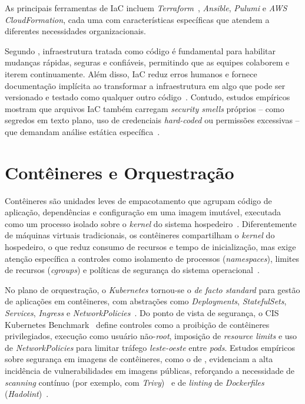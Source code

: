 As principais ferramentas de IaC incluem \textit{Terraform}~, \textit{Ansible}, \textit{Pulumi} e \textit{AWS CloudFormation}, cada uma com características específicas que atendem a diferentes necessidades organizacionais.

Segundo , infraestrutura tratada como código é fundamental para habilitar mudanças rápidas, seguras e confiáveis, permitindo que as equipes colaborem e iterem continuamente. Além disso, IaC reduz erros humanos e fornece documentação implícita ao transformar a infraestrutura em algo que pode ser versionado e testado como qualquer outro código~. Contudo, estudos empíricos mostram que arquivos IaC também carregam \textit{security smells} próprios -- como segredos em texto plano, uso de credenciais \textit{hard-coded} ou permissões excessivas -- que demandam análise estática específica~.

\section{Contêineres e Orquestração}
\label{sec:containers-orquestracao}

Contêineres são unidades leves de empacotamento que agrupam código de aplicação, dependências e configuração em uma imagem imutável, executada como um processo isolado sobre o \textit{kernel} do sistema hospedeiro~. Diferentemente de máquinas virtuais tradicionais, os contêineres compartilham o \textit{kernel} do hospedeiro, o que reduz consumo de recursos e tempo de inicialização, mas exige atenção específica a controles como isolamento de processos (\textit{namespaces}), limites de recursos (\textit{cgroups}) e políticas de segurança do sistema operacional~.

No plano de orquestração, o \textit{Kubernetes} tornou-se o \textit{de facto standard} para gestão de aplicações em contêineres, com abstrações como \textit{Deployments}, \textit{StatefulSets}, \textit{Services}, \textit{Ingress} e \textit{NetworkPolicies}~. Do ponto de vista de segurança, o CIS Kubernetes Benchmark~ define controles como a proibição de contêineres privilegiados, execução como usuário não-\textit{root}, imposição de \textit{resource limits} e uso de \textit{NetworkPolicies} para limitar tráfego \textit{leste-oeste} entre \textit{pods}. Estudos empíricos sobre segurança em imagens de contêineres, como o de , evidenciam a alta incidência de vulnerabilidades em imagens públicas, reforçando a necessidade de \textit{scanning} contínuo (por exemplo, com \textit{Trivy})~ e de \textit{linting} de \textit{Dockerfiles} (\textit{Hadolint})~.

